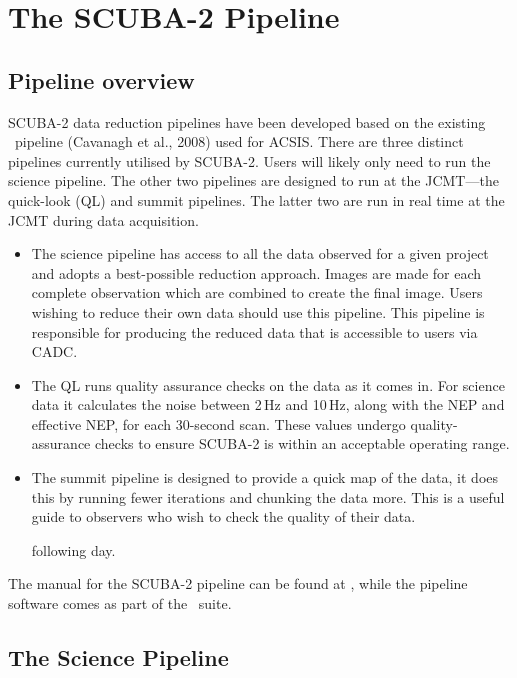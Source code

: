 \chapter{The SCUBA-2 Pipeline}
\label{sec:pipe}

\section{Pipeline overview}

SCUBA-2 data reduction pipelines have been developed based on the
existing \oracdr\ pipeline (Cavanagh et al., 2008\cite{oracdr}) used
for ACSIS. There are three distinct pipelines currently utilised by
SCUBA-2. Users will likely only need to run the science pipeline. The
other two pipelines are designed to run at the JCMT---the quick-look (QL) and
summit pipelines. The latter two are run in real time at the JCMT
during data acquisition.

\begin{itemize}
\item The science pipeline has access to all the data observed for a
given project and adopts a best-possible reduction approach. Images are
made for each complete observation which are combined to create the final
image. Users wishing to reduce their own data should use this pipeline.
This pipeline is responsible for producing the reduced data that is
accessible to users via CADC.
\item The QL runs quality assurance checks on the data as it comes in.
For science data it calculates the noise between 2\,Hz and 10\,Hz,
along with the NEP and effective NEP, for each 30-second scan. These
values undergo quality-assurance checks to ensure SCUBA-2 is within
an acceptable operating range.
\item The summit pipeline is designed to provide a quick map of the
data, it does this by running fewer iterations and chunking the data
more. This is a useful guide to observers who wish to check the
quality of their data.

following day.
\end{itemize}

The manual for the SCUBA-2 pipeline can be found at \pipelinesun,
while the pipeline software comes as part of the \starlink\ suite.


\section{The Science Pipeline}

